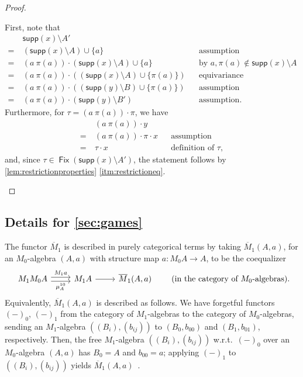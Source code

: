 \documentclass[11pt,a4paper]{amsart}
\newcommand{\supp}{\mathsf{supp}}
\newcommand{\Fix}{\mathop{\mathsf{Fix}}}
\newcommand{\mbar}{\overline{M}_1}
\theoremstyle{plain}
\numberwithin{equation}{section}
\newcommand{\+}[1]{\mathcal{#1}\xspace}
\theoremstyle{definition}
\begin{document}
\begin{proof}
\begin{itemize}
      First, note that
      \begin{align*}
        &\supp(x) \setminus A' \\
        =~&(\supp(x) \setminus A) \cup \{a\} && \text{assumption} \\
        =~&(a\ \pi(a)) \cdot (\supp(x) \setminus A) \cup \{a\} && \text{by } a,\pi(a) \notin \supp(x) \setminus A \\
        =~&(a\ \pi(a)) \cdot ((\supp(x) \setminus A) \cup \{\pi(a)\}) && \text{equivariance} \\
        =~&(a\ \pi(a)) \cdot ((\supp(y) \setminus B) \cup \{\pi(a)\}) && \text{assumption} \\
        =~&(a\ \pi(a)) \cdot (\supp(y) \setminus B') && \text{assumption}.
      \end{align*}
      Furthermore, for $\tau = (a\ \pi(a)) \cdot \pi$, we have
      \begin{align*}
        &(a\ \pi(a)) \cdot y \\
        =~&(a\ \pi(a)) \cdot \pi \cdot x && \text{assumption} \\
        =~&\tau \cdot x && \text{definition of } \tau,
      \end{align*}
      and, since $\tau \in \Fix(\supp(x) \setminus A')$, the statement follows by \cref{lem:restrictionproperties} \eqref{itm:restrictioneq}.
  \end{itemize}
\end{proof}


\subsection{Details for \cref{sec:games}}

The functor $\mbar$ is described in purely categorical terms by taking
$\mbar(A,a)$, for an $M_0$-algebra $(A,a)$ with structure map
$a\colon M_0A\to A$, to be the coequalizer
\begin{equation*}
  \begin{tikzcd}
    M_1M_0A \arrow[shift left,"M_1a",r] \arrow[shift right,"\mu^{10}_A" below,r] & M_1 A\arrow[r] &  \mbar(A,a)
  \end{tikzcd}\qquad\text{(in the category of $M_0$-algebras).}
\end{equation*}
Equivalently, $\mbar (A,a)$ is described as follows. We have forgetful
functors $(-)_0$, $(-)_1$ from the category of $M_1$-algebras to the
category of $M_0$-algebras, sending an $M_1$-algebra
$((B_i),(b_{ij}))$ to $(B_0,b_{00})$ and $(B_1,b_{01})$,
respectively. Then, the free $M_1$-algebra $((B_i),(b_{ij}))$ w.r.t.\
$(-)_0$ over an $M_0$-algebra $(A,a)$ has $B_0=A$ and $b_{00}=a$;
applying $(-)_1$ to $((B_i),(b_{ij}))$ yields
$\mbar(A,a)$~\cite{FordEA22,ForsterEA25a}.
\end{document}
